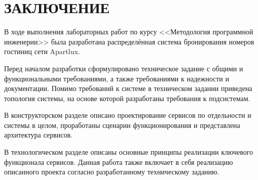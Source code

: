 \section*{ЗАКЛЮЧЕНИЕ}

В ходе выполнения лабораторных работ по курсу <<Методология программной инженерии>> была разработана распределённая система бронирования номеров гостиниц сети Apartlux. 

Перед началом разработки сформулировано техническое задание с общими и функциональными требованиями, а также требованиями к надежности и документации. Помимо требований к системе в техническом задании приведена топология системы, на основе которой разработаны требования к подсистемам. 

В конструкторском разделе описано проектирование сервисов по отдельности и системы в целом, проработаны сценарии функционирования и представлена архитектура сервисов. 

В технологическом разделе описаны основные принципы реализации ключевого
функционала сервисов. Данная работа также включает в себя реализацию описанного проекта согласно разработанному техническому заданию.
